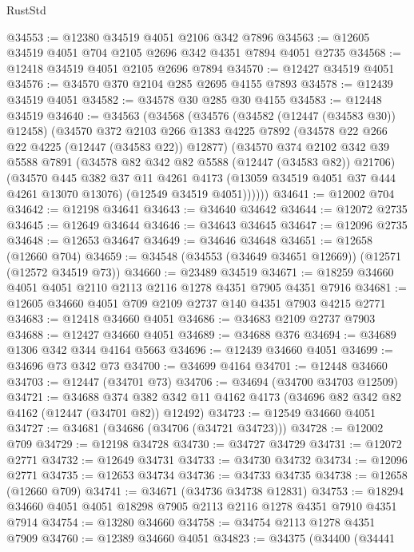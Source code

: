 \begin{lexlean}{RustStd}
\begin{coremodule}
@34553 := @12380 @34519 @4051 @2106 @342 @7896
@34563 := @12605 @34519 @4051 @704 @2105 @2696 @342 @4351 @7894 @4051 @2735
@34568 := @12418 @34519 @4051 @2105 @2696 @7894
@34570 := @12427 @34519 @4051
@34576 := @34570 @370 @2104 @285 @2695 @4155 @7893
@34578 := @12439 @34519 @4051
@34582 := @34578 @30 @285 @30 @4155
@34583 := @12448 @34519
@34640 := @34563
    (@34568
      (@34576
        (@34582 (@12447 (@34583 @30)) @12458)
        (@34570
          @372
          @2103
          @266
          @1383
          @4225
          @7892
          (@34578 @22 @266 @22 @4225 (@12447 (@34583 @22)) @12877)
          (@34570
            @374
            @2102
            @342
            @39
            @5588
            @7891
            (@34578 @82 @342 @82 @5588 (@12447 (@34583 @82)) @21706)
            (@34570
              @445
              @382
              @37
              @11
              @4261
              @4173
              (@13059 @34519 @4051 @37 @444 @4261 @13070 @13076)
              (@12549 @34519 @4051))))))
@34641 := @12002 @704
@34642 := @12198 @34641
@34643 := @34640 @34642
@34644 := @12072 @2735
@34645 := @12649 @34644
@34646 := @34643 @34645
@34647 := @12096 @2735
@34648 := @12653 @34647
@34649 := @34646 @34648
@34651 := @12658 (@12660 @704)
@34659 := @34548 (@34553 (@34649 @34651 @12669)) (@12571 (@12572 @34519 @73))
@34660 := @23489 @34519
@34671 := @18259 @34660 @4051 @4051 @2110 @2113 @2116 @1278 @4351 @7905 @4351 @7916
@34681 := @12605 @34660 @4051 @709 @2109 @2737 @140 @4351 @7903 @4215 @2771
@34683 := @12418 @34660 @4051
@34686 := @34683 @2109 @2737 @7903
@34688 := @12427 @34660 @4051
@34689 := @34688 @376
@34694 := @34689 @1306 @342 @344 @4164 @5663
@34696 := @12439 @34660 @4051
@34699 := @34696 @73 @342 @73
@34700 := @34699 @4164
@34701 := @12448 @34660
@34703 := @12447 (@34701 @73)
@34706 := @34694 (@34700 @34703 @12509)
@34721 := @34688
    @374
    @382
    @342
    @11
    @4162
    @4173
    (@34696 @82 @342 @82 @4162 (@12447 (@34701 @82)) @12492)
@34723 := @12549 @34660 @4051
@34727 := @34681 (@34686 (@34706 (@34721 @34723)))
@34728 := @12002 @709
@34729 := @12198 @34728
@34730 := @34727 @34729
@34731 := @12072 @2771
@34732 := @12649 @34731
@34733 := @34730 @34732
@34734 := @12096 @2771
@34735 := @12653 @34734
@34736 := @34733 @34735
@34738 := @12658 (@12660 @709)
@34741 := @34671 (@34736 @34738 @12831)
@34753 := @18294 @34660 @4051 @4051 @18298 @7905 @2113 @2116 @1278 @4351 @7910 @4351 @7914
@34754 := @13280 @34660
@34758 := @34754 @2113 @1278 @4351 @7909
@34760 := @12389 @34660 @4051
@34823 := @34375
    (@34400
      (@34441

\end{coremodule}
\end{lexlean}
